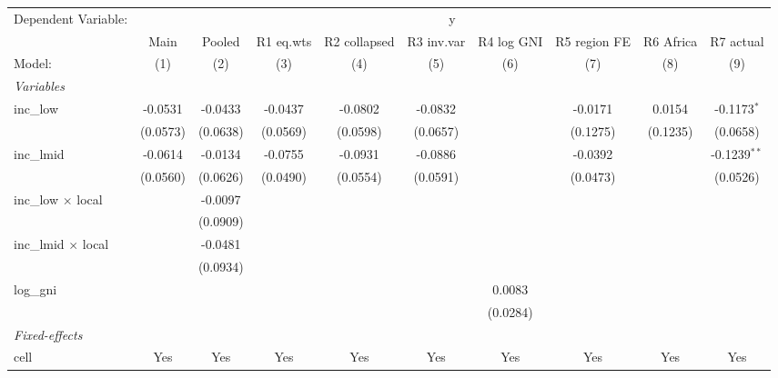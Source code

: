 
\begingroup
\centering
\begin{tabular}{lccccccccc}
   \tabularnewline \midrule \midrule
   Dependent Variable: & \multicolumn{9}{c}{y}\\
                              & Main     & Pooled   & R1 eq.wts & R2 collapsed & R3 inv.var & R4 log GNI & R5 region FE & R6 Africa & R7 actual \\   
   Model:                     & (1)      & (2)      & (3)       & (4)          & (5)        & (6)        & (7)          & (8)       & (9)\\  
   \midrule
   \emph{Variables}\\
   inc\_low                   & -0.0531  & -0.0433  & -0.0437   & -0.0802      & -0.0832    &            & -0.0171      & 0.0154    & -0.1173$^{*}$\\   
                              & (0.0573) & (0.0638) & (0.0569)  & (0.0598)     & (0.0657)   &            & (0.1275)     & (0.1235)  & (0.0658)\\   
   inc\_lmid                  & -0.0614  & -0.0134  & -0.0755   & -0.0931      & -0.0886    &            & -0.0392      &           & -0.1239$^{**}$\\   
                              & (0.0560) & (0.0626) & (0.0490)  & (0.0554)     & (0.0591)   &            & (0.0473)     &           & (0.0526)\\   
   inc\_low $\times$ local    &          & -0.0097  &           &              &            &            &              &           &   \\   
                              &          & (0.0909) &           &              &            &            &              &           &   \\   
   inc\_lmid $\times$ local   &          & -0.0481  &           &              &            &            &              &           &   \\   
                              &          & (0.0934) &           &              &            &            &              &           &   \\   
   log\_gni                   &          &          &           &              &            & 0.0083     &              &           &   \\   
                              &          &          &           &              &            & (0.0284)   &              &           &   \\   
   \midrule
   \emph{Fixed-effects}\\
   cell                       & Yes      & Yes      & Yes       & Yes          & Yes        & Yes        & Yes          & Yes       & Yes\\  

\end{tabular}
